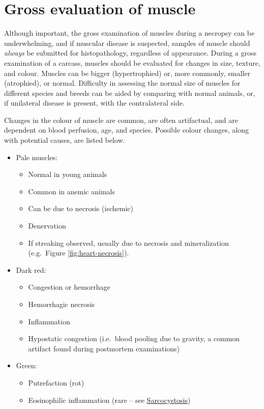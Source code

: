 \documentclass[openany]{book}
\providecommand{\tightlist}{%
  \setlength{\itemsep}{0pt}\setlength{\parskip}{0pt}}
\begin{document}
\section{Gross evaluation of muscle}\label{gross-evaluation-of-muscle}

Although important, the gross examination of muscles during a necropsy
can be underwhelming, and if muscular disease is suspected, samples of
muscle should \emph{always} be submitted for histopathology, regardless
of appearance. During a gross examination of a carcass, muscles should
be evaluated for changes in size, texture, and colour. Muscles can be
bigger (hypertrophied) or, more commonly, smaller (atrophied), or
normal. Difficulty in assessing the normal size of muscles for different
species and breeds can be aided by comparing with normal animals, or, if
unilateral disease is present, with the contralateral side.

Changes in the colour of muscle are common, are often artifactual, and
are dependent on blood perfusion, age, and species. Possible colour
changes, along with potential causes, are listed below.

\begin{itemize}
\tightlist
\item
  Pale muscles:

  \begin{itemize}
  \tightlist
  \item
    Normal in young animals
  \item
    Common in anemic animals
  \item
    Can be due to necrosis (ischemic)
  \item
    Denervation
  \item
    If streaking observed, usually due to necrosis and mineralization
    (e.g.~Figure \ref{fig:heart-necrosis}).
  \end{itemize}
\item
  Dark red:

  \begin{itemize}
  \tightlist
  \item
    Congestion or hemorrhage
  \item
    Hemorrhagic necrosis
  \item
    Inflammation
  \item
    Hypostatic congestion (i.e.~blood pooling due to gravity, a common
    artifact found during postmortem examinations)
  \end{itemize}
\item
  Green:

  \begin{itemize}
  \tightlist
  \item
    Putrefaction (rot)
  \item
    Eosinophilic inflammation (rare -- see
    \protect\hyperlink{sarcocystosis}{Sarcocystosis})
  \end{itemize}
\end{itemize}
\end{document}
